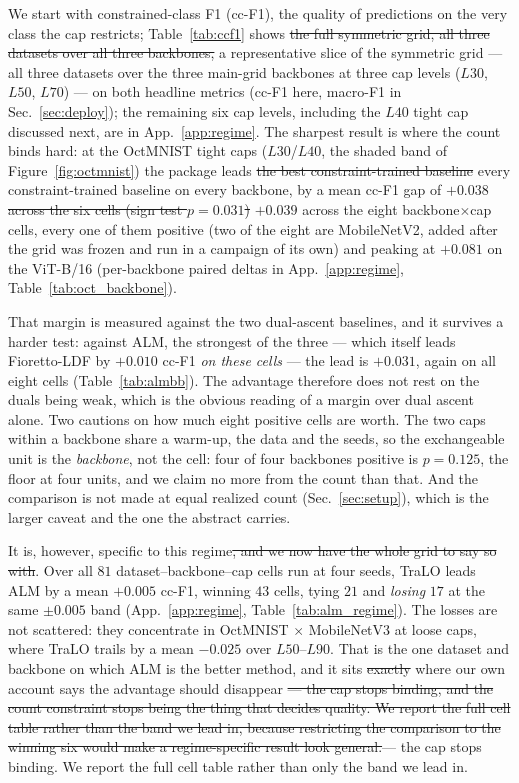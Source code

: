 \documentclass[10pt]{article}
\newcommand{\del}[1]{{\color{red}\sout{#1}}}
\begin{document}
We start with constrained-class F1 (cc-F1), the quality of predictions on
the very class the cap restricts; Table~\ref{tab:ccf1} shows \del{the full
symmetric grid, all three datasets over all three backbones,}%
{\color{blue}a representative slice of the symmetric grid --- all three datasets
over the three main-grid backbones at three cap levels ($L30$, $L50$, $L70$) ---}
on both
headline metrics (cc-F1 here, macro-F1 in Sec.~\ref{sec:deploy}){\color{blue};
the remaining six cap levels, including the $L40$ tight cap discussed next, are
in App.~\ref{app:regime}}. The
sharpest result is where the count binds hard: at the OctMNIST tight caps
($L30$/$L40$, the shaded band of Figure~\ref{fig:octmnist}) the package
leads \del{the best constraint-trained baseline}%
{\color{blue}every constraint-trained baseline} on every backbone, by a mean
cc-F1 gap of \del{$+0.038$ across the six cells (sign test $p{=}0.031$)}%
{\color{blue}$+0.039$ across the eight backbone$\times$cap cells, every one of
them positive (two of the eight are MobileNetV2, added after the grid was frozen
and run in a campaign of its own)} and
peaking at $+0.081$ on the ViT-B/16 (per-backbone paired deltas in
{\color{blue}App.~\ref{app:regime}, }Table~\ref{tab:oct_backbone}).
{\color{blue}That margin is measured against the two dual-ascent baselines, and
it survives a harder test: against ALM, the strongest of the three --- which
itself leads Fioretto-LDF by $+0.010$ cc-F1 \emph{on these cells} --- the lead is
$+0.031$, again on
all eight cells (Table~\ref{tab:almbb}). The advantage therefore does not rest
on the duals being weak, which is the obvious reading of a margin over dual ascent
alone. Two cautions on how much eight positive cells are worth. The two caps
within a backbone share a warm-up, the data and the seeds, so the exchangeable
unit is the \emph{backbone}, not the cell: four of four backbones positive is
$p{=}0.125$, the floor at four units, and we claim no more from the count than
that. And the comparison is not made at equal realized count
(Sec.~\ref{sec:setup}), which is the larger caveat and the one the abstract
carries.

It is, however, specific to this regime\del{, and we now have the whole grid to say so
with}. Over all $81$ dataset--backbone--cap cells run at four seeds, TraLO leads
ALM by a mean $+0.005$ cc-F1, winning $43$ cells, tying $21$ and \emph{losing}
$17$ at the same $\pm0.005$ band ({\color{blue}App.~\ref{app:regime}, }Table~\ref{tab:alm_regime}). The losses are not
scattered: they concentrate in OctMNIST $\times$ MobileNetV3 at loose caps, where
TraLO trails by a mean $-0.025$ over $L50$--$L90$. That is the one dataset and
backbone on which ALM is the better method, and it sits \del{exactly }where our own
account says the advantage should disappear \del{--- the cap stops binding, and the
count constraint stops being the thing that decides quality. We report the full
cell table rather than the band we lead in, because restricting the comparison to
the winning six would make a regime-specific result look general.}{--- the cap
stops binding. We report the full cell table rather than only the band we lead in.}}
\end{document}
